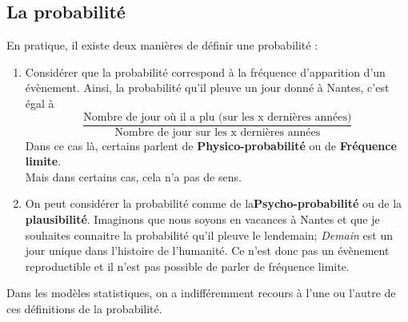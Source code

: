 \subsection{La probabilité}
En pratique, il existe deux manières de définir une probabilité :
\begin{enumerate}
\item Considérer que la probabilité correspond à la fréquence d'apparition d'un évènement. Ainsi, la probabilité qu'il pleuve un jour donné à Nantes, c'est égal à 
$$\frac{\textrm{Nombre de jour où il a plu (sur les x dernières années)}}{\textrm{Nombre de jour sur les x dernières années}}$$
Dans ce cas là, certains parlent de \textbf{Physico-probabilité} ou de \textbf{Fréquence limite}.\newline
\\
Mais dans certains cas, cela n'a pas de sens. 
\item On peut considérer la probabilité comme de la\textbf{Psycho-probabilité} ou de la \textbf{plausibilité}. Imaginons que nous soyons en vacances à Nantes et que je souhaites connaitre la probabilité qu'il pleuve le lendemain; \textit{Demain} est un jour unique dans l'histoire de l'humanité. Ce n'est donc pas un évènement reproductible et il n'est pas possible de parler de fréquence limite.
\end{enumerate}
Dans les modèles statistiques, on a indifféremment recours à l'une ou l'autre de ces définitions de la probabilité.




